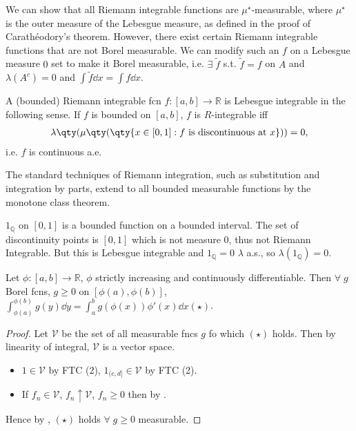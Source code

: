 \begin{remark}
	We can show that all Riemann integrable functions are $\mu^\star$-measurable, where $\mu^\star$ is the outer measure of the Lebesgue measure, as defined in the proof of Carath\'eodory's theorem.
	However, there exist certain Riemann integrable functions that are not Borel measurable.
	We can modify such an $f$ on a Lebesgue measure $0$ set to make it Borel measurable, i.e. $\exists \; \widetilde f$ s.t. $\widetilde{f} = f$ on $A$ and $\lambda(A^c) = 0$ and $\int \widetilde{f} \dd{x} = \int f \dd{x}$.

	A (bounded) Riemann integrable fcn $f : [a, b] \to \mathbb{R}$ is Lebesgue integrable in the following sense.
	If $f$ is bounded on $[a, b]$, $f$ is $R$-integrable iff
	\begin{align*}
		\lambda\qty(\mu\qty(\qty{x \in [0,1] : f \text{ is discontinuous at } x})) = 0,
	\end{align*} i.e. $f$ is continuous a.e.

	The standard techniques of Riemann integration, such as substitution and integration by parts, extend to all bounded measurable functions by the monotone class theorem.
\end{remark}

\begin{example}
	$1_\mathbb{Q}$ on $[0, 1]$ is a bounded function on a bounded interval.
	The set of discontinuity points is $[0, 1]$ which is not measure $0$, thus not Riemann Integrable.
	But this is Lebesgue integrable and $1_\mathbb{Q} = 0$ $\lambda$ a.s., so $\lambda(1_\mathbb{Q}) = 0$.
\end{example}

\begin{theorem}
	Let $\phi : [a, b] \to \mathbb{R}$, $\phi$ strictly increasing and continuously differentiable.
	Then $\forall \; g$ Borel fcns, $g \geq 0$ on $[\phi(a), \phi(b)]$, $\int_{\phi(a)}^{\phi(b)} g(y) \dd{y} = \int_a^b g(\phi(x)) \phi'(x) \dd{x} (\star)$.
\end{theorem}

\begin{proof}
	Let $\mathcal{V}$ be the set of all measurable fncs $g$ fo which $(\star)$ holds.
	Then by linearity of integral, $\mathcal{V}$ is a vector space.
	\begin{itemize}
		\item $1 \in \mathcal{V}$ by FTC (2), $1_{(c, d]} \in \mathcal{V}$ by FTC (2).
		\item If $f_n \in \mathcal{V}$, $f_n \uparrow \mathcal{V}$, $f_n \geq 0$ then by .
	\end{itemize}
	Hence by , $(\star)$ holds $\forall \; g \geq 0$ measurable.
\end{proof}

